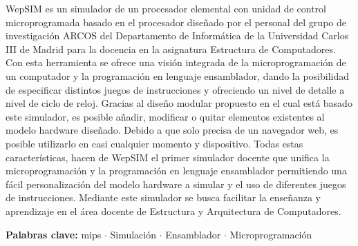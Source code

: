 % 
% 
%
\thispagestyle{plain}

WepSIM es un simulador de un procesador elemental con unidad de control microprogramada basado en el procesador diseñado por el personal del grupo de investigación ARCOS del Departamento de Informática de la Universidad Carlos III de Madrid para la docencia en la asignatura Estructura de Computadores. 
   Con esta herramienta se ofrece una visión integrada de la microprogramación de un computador y la programación en lenguaje ensamblador, dando la posibilidad de especificar distintos juegos de instrucciones y ofreciendo un nivel de detalle a nivel de ciclo de reloj. 
   Gracias al diseño modular propuesto en el cual está basado este simulador, es posible añadir, modificar o quitar elementos existentes al modelo hardware diseñado. 
   Debido a que solo precisa de un navegador web, es posible utilizarlo en casi cualquier momento y dispositivo.
   Todas estas características, hacen de WepSIM el primer simulador docente que unifica la microprogramación y la programación en lenguaje ensamblador permitiendo una fácil personalización del modelo hardware a simular y el uso de diferentes juegos de instrucciones. Mediante este simulador se busca facilitar la enseñanza y aprendizaje en el área docente de Estructura y Arquitectura de Computadores.
\vspace{0.7cm}

\textbf{Palabras clave:} \acrshort{mips} $\cdot$ Simulación $\cdot$ Ensamblador $\cdot$ Microprogramación
